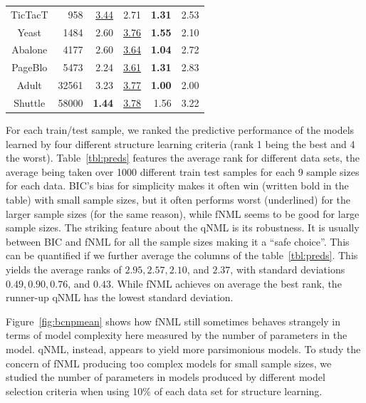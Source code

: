 \begin{table}
\begin{center}
\begin{tabular}{crrrrr}
 TicTacT &    958 &  \underline{3.44} &              2.71 &     \textbf{1.31} &           2.53 \\
   Yeast &   1484 &              2.60 &  \underline{3.76} &     \textbf{1.55} &           2.10 \\
 Abalone &   4177 &              2.60 &  \underline{3.64} &     \textbf{1.04} &           2.72 \\
 PageBlo &   5473 &              2.24 &  \underline{3.61} &     \textbf{1.31} &           2.83 \\
   Adult &  32561 &              3.23 &  \underline{3.77} &     \textbf{1.00} &           2.00 \\
 Shuttle &  58000 &     \textbf{1.44} &  \underline{3.78} &              1.56 &           3.22 \\
\end{tabular}
\end{center}
\end{table}

For each train/test sample, we ranked the predictive performance of
the models learned by four different structure learning criteria (rank
1 being the best and 4 the worst). Table~\ref{tbl:preds} features the
average rank for different data sets, the average being taken over
1000 different train test samples for each 9 sample sizes for each
data.  BIC's bias for simplicity makes it often win (written bold in
the table) with small sample sizes, but it often performs worst
(underlined) for the larger sample sizes (for the same reason), while
fNML seems to be good for large sample sizes. The striking feature
about the qNML is its robustness.  It is usually between BIC and fNML
for all the sample sizes making it a ``safe choice''. This can be
quantified if we further average the columns of the
table~\ref{tbl:preds}.  This yields the average ranks of $2.95, 2.57,
2.10$, and $2.37$, with standard deviations $0.49, 0.90, 0.76$, and
$0.43$.  While fNML achieves on average the best rank, the runner-up
qNML has the lowest standard deviation.

Figure~\ref{fig:bcnpmean} shows how fNML still sometimes behaves
strangely in terms of model complexity here measured by the number of
parameters in the model. qNML, instead, appears to yield more
parsimonious models. To study the concern of fNML producing too
complex models for small sample sizes, we studied the number of
parameters in models produced by different model selection criteria
when using 10\% of each data set for structure learning.

